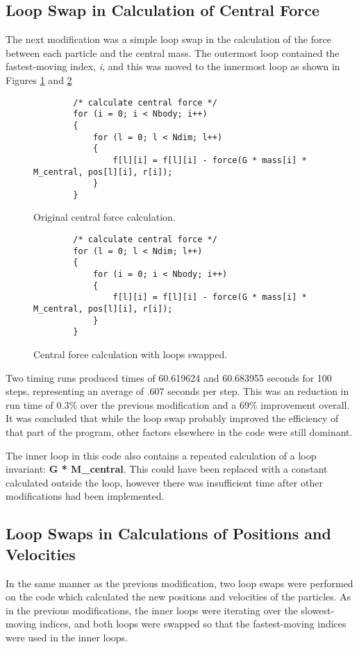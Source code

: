 \documentclass[11pt, oneside]{article}   %
\begin{document}
\subsection{Loop Swap in Calculation of Central Force}
The next modification was a simple loop swap in the calculation of the force between each particle and the central mass.
The outermost loop contained the fastest-moving index, {\em i}, and this was moved to the innermost loop as shown in Figures \ref{figure:CfOrig} and \ref{figure:CfMod}

\begin{figure}
	\begin{lstlisting}
		/* calculate central force */
		for (i = 0; i < Nbody; i++)
		{
			for (l = 0; l < Ndim; l++)
			{
				f[l][i] = f[l][i] - force(G * mass[i] * M_central, pos[l][i], r[i]);
			}
		}
	\end{lstlisting}
	\caption{Original central force calculation.}
	\label{figure:CfOrig}
\end{figure}

\begin{figure}
	\begin{lstlisting}
		/* calculate central force */
		for (l = 0; l < Ndim; l++)
		{
			for (i = 0; i < Nbody; i++)
			{
				f[l][i] = f[l][i] - force(G * mass[i] * M_central, pos[l][i], r[i]);
			}
		}
	\end{lstlisting}
	\caption{Central force calculation with loops swapped.}
	\label{figure:CfMod}
\end{figure}

Two timing runs produced times of 60.619624 and 60.683955 seconds for 100 steps, representing an average of .607 seconds per step.
This was an reduction in run time of 0.3\% over the previous modification and a 69\% improvement overall.
It was concluded that while the loop swap probably improved the efficiency of that part of the program, other factors elsewhere in the code were still dominant.

The inner loop in this code also contains a repeated calculation of a loop invariant: \textbf{G * M\_central}.
This could have been replaced with a constant calculated outside the loop, however there was insufficient time after other modifications had been implemented.

\subsection{Loop Swaps in Calculations of Positions and Velocities}
In the same manner as the previous modification, two loop swaps were performed on the code which calculated the new positions and velocities of the particles.
As in the previous modifications, the inner loops were iterating over the slowest-moving indices, and both loops were swapped so that the fastest-moving indices were used in the inner loops. 
\end{document}
